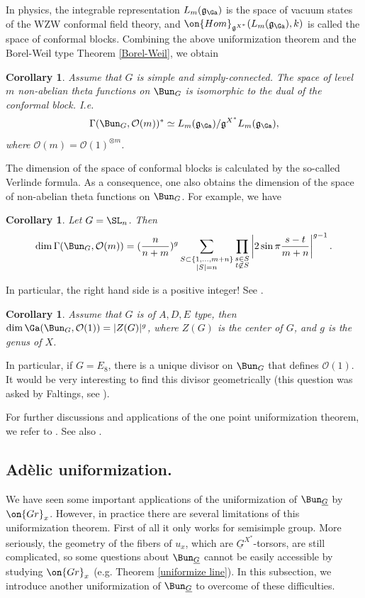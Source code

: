 \documentclass[]{pcmi}
\theoremstyle{plain}
\newtheorem{cor}[equation]{Corollary}
\theoremstyle{remark}
\theoremstyle{definition}
\newcommand{\frakg}{{\mathfrak g}}
\newcommand{\mO}{{\mathcal O}}
\newcommand{\Gr}{{\on{Gr}}}
\newcommand{\Hom}{{\on{Hom}}}
\begin{document}
In physics, the integrable representation $L_m(\frakg_\Ga)$  is the space of vacuum states of the WZW conformal field theory, and $\Hom_{\frakg^{X^*}}(L_m(\frakg_\Ga),k)$ is called the space of conformal blocks. Combining the above uniformization theorem and the Borel-Weil type Theorem \ref{Borel-Weil}, we obtain
\begin{cor}Assume that $G$ is simple and simply-connected.
The space of level $m$ non-abelian theta functions on $\Bun_G$ is isomorphic to the dual of the conformal block. I.e.
\[\Gamma(\Bun_G,\mO(m))^*\simeq L_m(\frakg_\Ga)/\frakg^{X^*} L_m(\frakg_\Ga),\]
where $\mO(m)=\mO(1)^{\otimes m}$.
\end{cor}
The dimension of the space of conformal blocks is calculated by the so-called Verlinde formula. As a consequence, one also obtains the dimension of the space of non-abelian theta functions on $\Bun_G$. For example, we have
\begin{cor}Let $G=\SL_n$. Then
\[\dim \Gamma(\Bun_G,\mO(m))= (\frac{n}{n+m})^g \sum_{\substack{S\subset \{1,\ldots,m+n\}\\|S|=n}}\prod_{\substack{s\in S\\ t\not\in S}}\left|2\sin\pi\frac{s-t}{m+n}\right|^{g-1}.\]
\end{cor}
In particular, the right hand side is a positive integer! See \cite[Corollary 8.6]{BL}.
\begin{cor}Assume that $G$ is of $A,D,E$ type, then $\dim \Ga(\Bun_G,\mO(1))=|Z(G)|^g$, where $Z(G)$ is the center of $G$, and $g$ is the genus of $X$.
\end{cor}
In particular, if $G=E_8$, there is a unique divisor on $\Bun_G$ that defines $\mO(1)$. It would be very interesting to find this divisor geometrically (this question was asked by Faltings, see \cite{Fa2}).


For further discussions and applications of the one point uniformization theorem, we refer to \cite{BL, LS, BLS, So0, So, He}. See also \cite{KNR, KN}. 


\subsection{Ad\`elic uniformization.}
We have seen some important applications of the uniformization of $\Bun_{\underline G}$ by $\Gr_x$. However, in practice there are several limitations of this uniformization theorem. First of all it only works for semisimple group. More seriously, the geometry of the fibers of $u_x$, which 
are $\underline G^{X^*}$-torsors, are still complicated, so some questions about $\Bun_{\underline G}$ cannot be easily accessible by studying $\Gr_x$ (e.g. Theorem \ref{uniformize line}).
In this subsection, we introduce another uniformization of $\Bun_{\underline G}$ to overcome of these difficulties.
\end{document}
